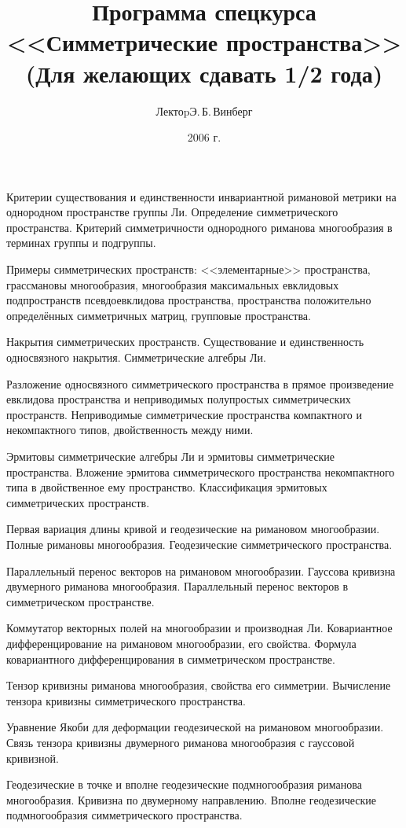 \documentclass[a4paper]{article}
\title{Программа спецкурса <<Симметрические пространства>>\\
(Для желающих сдавать 1/2 года)}
\author{Лектоp\т Э.\,Б.\,Винберг}
\date{2006 г.}
\begin{document}
\maketitle

\begin{nums}{-2}
\item Критерии существования и единственности инвариантной римановой метрики на однородном пространстве группы
Ли. Определение симметрического пространства. Критерий симметричности однородного риманова многообразия в терминах
группы и подгруппы.
\item Примеры симметрических пространств: <<элементарные>> пространства, грассмановы многообразия, многообразия
максимальных евклидовых подпространств псевдоевклидова пространства, пространства положительно определённых
симметричных матриц, групповые пространства.
\item Накрытия симметрических пространств. Существование и единственность односвязного накрытия. Симметрические
алгебры Ли.
\item Разложение односвязного симметрического пространства в прямое произведение евклидова пространства и
неприводимых полупростых симметрических пространств. Неприводимые симметрические пространства компактного и
некомпактного типов, двойственность между ними.
\item Эрмитовы симметрические алгебры Ли и эрмитовы симметрические пространства. Вложение эрмитова симметрического
пространства некомпактного типа в двойственное ему пространство. Классификация эрмитовых симметрических
пространств.
\item Первая вариация длины кривой и геодезические на римановом многообразии. Полные римановы многообразия.
Геодезические симметрического пространства.
\item Параллельный перенос векторов на римановом многообразии. Гауссова кривизна двумерного риманова многообразия.
Параллельный перенос векторов в симметрическом пространстве.
\item Коммутатор векторных полей на многообразии и производная Ли. Ковариантное дифференцирование на римановом
многообразии, его свойства. Формула ковариантного дифференцирования в симметрическом пространстве.
\item Тензор кривизны риманова многообразия, свойства его симметрии. Вычисление тензора кривизны симметрического
пространства.
\item Уравнение Якоби для деформации геодезической на римановом многообразии. Связь тензора кривизны двумерного
риманова многообразия с гауссовой кривизной.
\item Геодезические в точке и вполне геодезические подмногообразия риманова многообразия. Кривизна по двумерному
направлению. Вполне геодезические подмногообразия симметрического пространства.
\end{nums}

\medskip\dmvntrail
\end{document}
